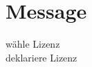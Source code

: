 
\section{Message}

\begin{frame}
	\begin{center}
		\Huge
		wähle Lizenz\\
		deklariere Lizenz
	\end{center}
\end{frame}
